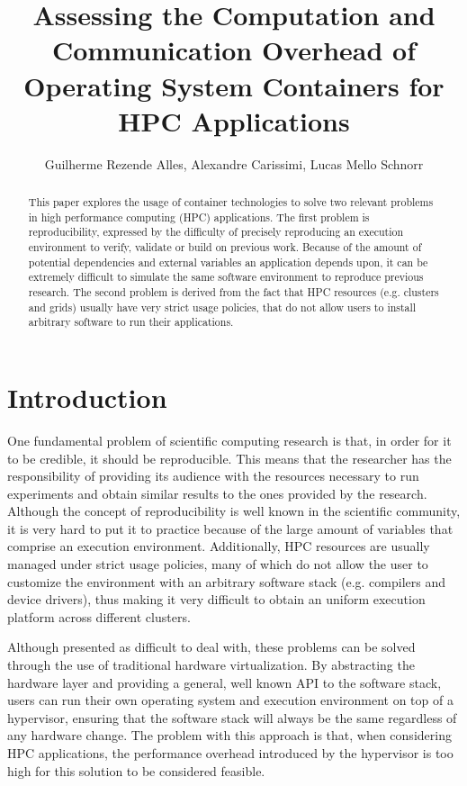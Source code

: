 \documentclass[12pt]{article}
\title{Assessing the Computation and Communication Overhead of Operating System Containers for HPC Applications}
\author{Guilherme Rezende Alles, Alexandre Carissimi, Lucas Mello Schnorr}
\begin{document}
 

\maketitle

\begin{abstract}
  This paper explores the usage of container technologies to solve two
  relevant problems in high performance computing (HPC)
  applications. The first problem is reproducibility, expressed by the
  difficulty of precisely reproducing an execution environment to
  verify, validate or build on previous work. Because of the amount of
  potential dependencies and external variables an application depends
  upon, it can be extremely difficult to simulate the same software
  environment to reproduce previous research. The second problem is
  derived from the fact that HPC resources (e.g. clusters and grids)
  usually have very strict usage policies, that do not allow users to
  install arbitrary software to run their applications.
\end{abstract}

\section{Introduction}
One fundamental problem of scientific computing research is that, in
order for it to be credible, it should be reproducible. This means
that the researcher has the responsibility of providing its audience
with the resources necessary to run experiments and obtain similar
results to the ones provided by the research. Although the concept of
reproducibility is well known in the scientific community, it is very
hard to put it to practice because of the large amount of variables
that comprise an execution environment. Additionally, HPC resources
are usually managed under strict usage policies, many of which do not
allow the user to customize the environment with an arbitrary software
stack (e.g. compilers and device drivers), thus making it very
difficult to obtain an uniform execution platform across different
clusters.

Although presented as difficult to deal with, these problems can be
solved through the use of traditional hardware virtualization. By
abstracting the hardware layer and providing a general, well known API
to the software stack, users can run their own operating system and
execution environment on top of a hypervisor, ensuring that the
software stack will always be the same regardless of any hardware
change. The problem with this approach is that, when considering HPC
applications, the performance overhead introduced by the hypervisor is
too high for this solution to be considered feasible.
\end{document}
